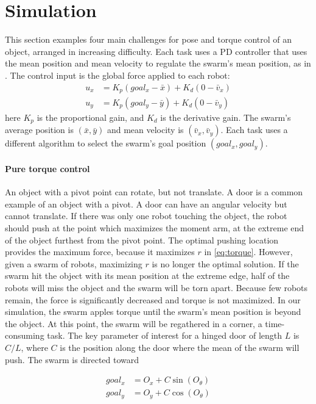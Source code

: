 
\section{Simulation}\label{sec:simulation}
This section examples four main challenges for pose and torque control of an object, arranged in increasing difficulty.  Each task uses a PD controller that uses the mean position and mean velocity to regulate the swarm's mean position,  as in \cite{ShahrokhiIROS2015}. The control input is the global force applied to each robot:
\begin{align}
u_x &= K_{p}(goal_x - \bar{x}) + K_{d}(0-\bar{v}_x) \nonumber\\
u_y &= K_{p}(goal_y  - \bar{y}) + K_{d}(0-\bar{v}_y)  \label{eq:PDcontrolPosition}
\end{align}
here $K_{p}$ is the proportional gain, and $K_{d}$ is the derivative gain.  
The swarm's average position is $(\bar{x},\bar{y})$ and mean velocity is $(\bar{v}_x,\bar{v}_y)$.  
Each task uses a different algorithm to select the swarm's goal position $(goal_x,goal_y)$.

\paragraph{Pure torque control} 
An object with a pivot point can rotate, but not translate. A door is a common example of an object with a pivot. A door can have an angular velocity but cannot translate. 
 If there was only one robot touching the object, the robot should push at the point which maximizes the moment arm, at the extreme end of the object furthest from the pivot point.
The optimal pushing location provides the maximum force, because it maximizes  $r$ in \eqref{eq:torque}.
However, given a swarm of robots, maximizing $r$ is no longer the optimal solution.  
If the swarm hit the object with its mean position at the extreme edge, half of the robots will miss the object and  the swarm will be torn apart.
Because few robots remain,  the force is significantly decreased and torque is not maximized.
 In our simulation, the swarm apples torque until the swarm's mean position is beyond the object.  At this point, the swarm will be regathered in a corner, a time-consuming task. 
 The key parameter of interest for a hinged door of length $L$ is $C/L$, where $C$ is the position along the door where the mean of the swarm will push.  The swarm is directed toward 
 
\begin{align}\nonumber
goal_x &= O_x + C \sin(O_{\theta}) \\
goal_y &= O_y + C \cos(O_{\theta})  \label{eq:TorqueControl}
\end{align}

